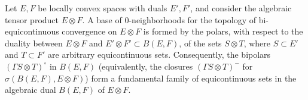 Let $E, F$ be locally convex spaces with duals $E', F'$, and consider the algebraic tensor product $E \otimes F$. A base of $0$-neighborhoods for the topology of bi-equicontinuous convergence on $E \otimes F$ is formed by the polars, with respect to the duality between $E \otimes F$ and $E' \otimes F' \subset B(E, F)$, of the sets $S \otimes T$, where $S \subset E'$ and $T \subset F'$ are arbitrary equicontinuous sets. Consequently, the bipolars $(\Gamma S \otimes T)^\circ$ in $B(E, F)$ (equivalently, the closures $(\Gamma S \otimes T)^-$ for $\sigma(B(E, F), E \otimes F)$) form a fundamental family of equicontinuous sets in the algebraic dual $B(E, F)$ of $E \otimes F$.
